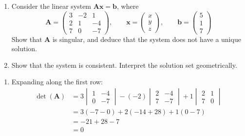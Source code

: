 \documentclass[leqno]{article}
\begin{document}
\djsFrontMatter
\begin{enumerate}[
  label=\textbf{\arabic*.},
  leftmargin=*,
  topsep=0pt,
  partopsep=0pt,
  parsep=0pt
]

\questionitem

\begin{enumerate}[label=\textbf{(\alph*)}]
  \item Consider the linear system $\mathbf{A}\mathbf{x}=\mathbf{b}$, where
  \[
  \mathbf{A}=\begin{pmatrix}
  3&-2&1\\
  2&1&-4\\
  7&0&-7
  \end{pmatrix},
  \qquad
  \mathbf{x}=\begin{pmatrix}x\\y\\z\end{pmatrix},
  \qquad
  \mathbf{b}=\begin{pmatrix}5\\1\\7\end{pmatrix}
  \]
  Show that $\mathbf{A}$ is singular, and deduce that the system does not have a unique solution. \\
  
  \item Show that the system is consistent. Interpret the solution set geometrically.  \\
\end{enumerate}

\vspace*{10pt}

\begin{djsSolution}
\begin{enumerate}[label=\textbf{(\alph*)}]
  \item Expanding along the first row:
\begin{align*}
\det(\mathbf{A})
&=3\begin{vmatrix}1&-4\\0&-7\end{vmatrix}
-(-2)\begin{vmatrix}2&-4\\7&-7\end{vmatrix}
+1\begin{vmatrix}2&1\\7&0\end{vmatrix}\\
&=3(-7-0)+2(-14+28)+1(0-7)\\
&=-21+28-7\\
&=0
\end{align*}


\end{enumerate}
\end{djsSolution}
\end{enumerate}
\end{document}
